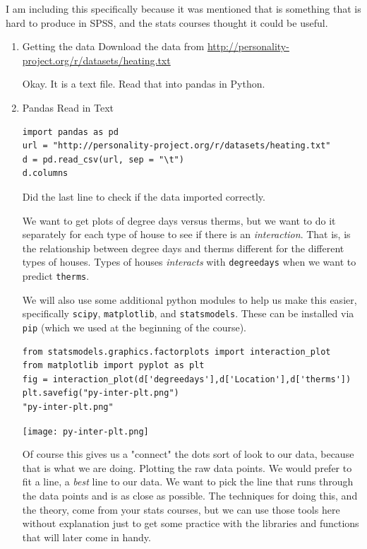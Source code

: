 \documentclass{article}
\begin{document}
I am including this specifically because it was mentioned that is something that is hard to produce in SPSS, and the stats courses thought it could be useful. 
\begin{enumerate}
\item Getting the data
\label{sec:orgad12201}
Download the data from \url{http://personality-project.org/r/datasets/heating.txt}

Okay. It is a text file. Read that into pandas in Python.
\item Pandas Read in Text
\label{sec:orgdd32d63}
\begin{verbatim}
import pandas as pd
url = "http://personality-project.org/r/datasets/heating.txt"
d = pd.read_csv(url, sep = "\t")
d.columns
\end{verbatim}

Did the last line to check if the data imported correctly. 

We want to get plots of degree days versus therms, but we want to do it separately for each type of house to see if there is an \emph{interaction}. That is, is the relationship between degree days and therms different for the different types of houses. Types of houses \emph{interacts} with \texttt{degreedays} when we want to predict \texttt{therms}. 

We will also use some additional python modules to help us make this easier, specifically \texttt{scipy}, \texttt{matplotlib}, and \texttt{statsmodels}. These can be installed via \texttt{pip} (which we used at the beginning of the course). 

\begin{verbatim}
from statsmodels.graphics.factorplots import interaction_plot
from matplotlib import pyplot as plt
fig = interaction_plot(d['degreedays'],d['Location'],d['therms'])
plt.savefig("py-inter-plt.png")
"py-inter-plt.png"
\end{verbatim}

\begin{center}
\texttt{[image: py-inter-plt.png]}
\end{center}

Of course this gives us a "connect" the dots sort of look to our data, because that is what we are doing. Plotting the raw data points. We would prefer to fit a line, a \emph{best} line to our data. We want to pick the line that runs through the data points and is as close as possible. The techniques for doing this, and the theory, come from your stats courses, but we can use those tools here without explanation just to get some practice with the libraries and functions that will later come in handy. 


\end{enumerate}
\end{document}
